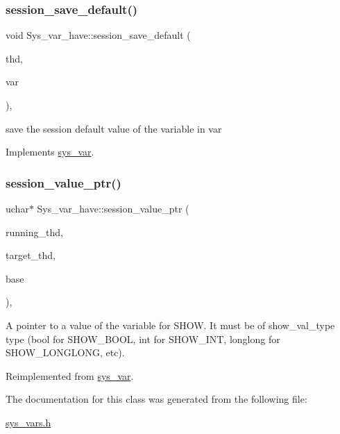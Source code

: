 \subsubsection{\texorpdfstring{session\+\_\+save\+\_\+default()}{session\_save\_default()}}
{\footnotesize\ttfamily void Sys\+\_\+var\+\_\+have\+::session\+\_\+save\+\_\+default (\begin{DoxyParamCaption}\item[{T\+HD $\ast$}]{thd,  }\item[{\mbox{\hyperlink{classset__var}{set\+\_\+var}} $\ast$}]{var }\end{DoxyParamCaption})\hspace{0.3cm}{\ttfamily [inline]}, {\ttfamily [virtual]}}

save the session default value of the variable in var 

Implements \mbox{\hyperlink{classsys__var}{sys\+\_\+var}}.

\mbox{\label{classSys__var__have_afdc6eb2392515af389e3615adbfa071f}} 
\subsubsection{\texorpdfstring{session\+\_\+value\+\_\+ptr()}{session\_value\_ptr()}}
{\footnotesize\ttfamily uchar$\ast$ Sys\+\_\+var\+\_\+have\+::session\+\_\+value\+\_\+ptr (\begin{DoxyParamCaption}\item[{T\+HD $\ast$}]{running\+\_\+thd,  }\item[{T\+HD $\ast$}]{target\+\_\+thd,  }\item[{L\+E\+X\+\_\+\+S\+T\+R\+I\+NG $\ast$}]{base }\end{DoxyParamCaption})\hspace{0.3cm}{\ttfamily [inline]}, {\ttfamily [virtual]}}

A pointer to a value of the variable for S\+H\+OW. It must be of show\+\_\+val\+\_\+type type (bool for S\+H\+O\+W\+\_\+\+B\+O\+OL, int for S\+H\+O\+W\+\_\+\+I\+NT, longlong for S\+H\+O\+W\+\_\+\+L\+O\+N\+G\+L\+O\+NG, etc). 

Reimplemented from \mbox{\hyperlink{classsys__var_a3e511591aaf555d2bc2ce40a80b7e899}{sys\+\_\+var}}.



The documentation for this class was generated from the following file\+:\begin{DoxyCompactItemize}
\item 
\mbox{\hyperlink{sys__vars_8h}{sys\+\_\+vars.\+h}}\end{DoxyCompactItemize}
